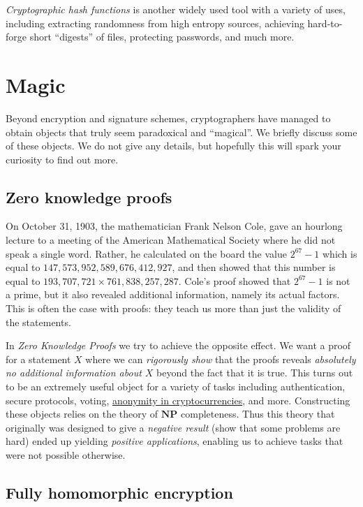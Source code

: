 \emph{Cryptographic hash functions} is another widely used tool with a
variety of uses, including extracting randomness from high entropy
sources, achieving hard-to-forge short ``digests'' of files, protecting
passwords, and much more.

\section{Magic}\label{Magic}

Beyond encryption and signature schemes, cryptographers have managed to
obtain objects that truly seem paradoxical and ``magical''. We briefly
discuss some of these objects. We do not give any details, but hopefully
this will spark your curiosity to find out more.

\subsection{Zero knowledge proofs}\label{Zero-knowledge-proofs}

On October 31, 1903, the mathematician Frank Nelson Cole, gave an
hourlong lecture to a meeting of the American Mathematical Society where
he did not speak a single word. Rather, he calculated on the board the
value \(2^{67}-1\) which is equal to \(147,573,952,589,676,412,927\),
and then showed that this number is equal to
\(193,707,721 \times 761,838,257,287\). Cole's proof showed that
\(2^{67}-1\) is not a prime, but it also revealed additional
information, namely its actual factors. This is often the case with
proofs: they teach us more than just the validity of the statements.

In \emph{Zero Knowledge Proofs} we try to achieve the opposite effect.
We want a proof for a statement \(X\) where we can \emph{rigorously
show} that the proofs reveals \emph{absolutely no additional information
about \(X\)} beyond the fact that it is true. This turns out to be an
extremely useful object for a variety of tasks including authentication,
secure protocols, voting,
\href{https://z.cash/technology/zksnarks.html}{anonymity in
cryptocurrencies}, and more. Constructing these objects relies on the
theory of \(\mathbf{NP}\) completeness. Thus this theory that originally
was designed to give a \emph{negative result} (show that some problems
are hard) ended up yielding \emph{positive applications}, enabling us to
achieve tasks that were not possible otherwise.

\subsection{Fully homomorphic
encryption}\label{Fully-homomorphic-encrypt}

